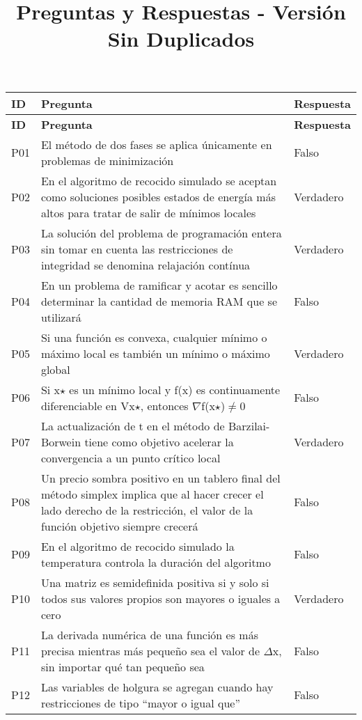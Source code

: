 \documentclass{article}
\title{Preguntas y Respuestas - Versión Sin Duplicados}
\author{}
\date{}
\begin{document}
\maketitle

\begin{longtable}{|p{1.5cm}|p{14cm}|p{2cm}|}
\hline
\textbf{ID} & \textbf{Pregunta} & \textbf{Respuesta} \\ 
\hline
\endfirsthead
\hline
\textbf{ID} & \textbf{Pregunta} & \textbf{Respuesta} \\
\hline
\endhead
\hline
\endfoot
\hline
\endlastfoot
P01 & El método de dos fases se aplica únicamente en problemas de minimización & Falso \\ \hline
P02 & En el algoritmo de recocido simulado se aceptan como soluciones posibles estados de energía más altos para tratar de salir de mínimos locales & Verdadero \\ \hline
P03 & La solución del problema de programación entera sin tomar en cuenta las restricciones de integridad se denomina relajación contínua & Verdadero \\ \hline
P04 & En un problema de ramificar y acotar es sencillo determinar la cantidad de memoria RAM que se utilizará & Falso \\ \hline
P05 & Si una función es convexa, cualquier mínimo o máximo local es también un mínimo o máximo global & Verdadero \\ \hline
P06 & Si x$\star$ es un mínimo local y f(x) es continuamente diferenciable en Vx$\star$, entonces $\nabla$f(x$\star$)$\neq$0 & Falso \\ \hline
P07 & La actualización de t en el método de Barzilai-Borwein tiene como objetivo acelerar la convergencia a un punto crítico local & Verdadero \\ \hline
P08 & Un precio sombra positivo en un tablero final del método simplex implica que al hacer crecer el lado derecho de la restricción, el valor de la función objetivo siempre crecerá & Falso \\ \hline
P09 & En el algoritmo de recocido simulado la temperatura controla la duración del algoritmo & Falso \\ \hline
P10 & Una matriz es semidefinida positiva si y solo si todos sus valores propios son mayores o iguales a cero & Verdadero \\ \hline
P11 & La derivada numérica de una función es más precisa mientras más pequeño sea el valor de $\Delta$x, sin importar qué tan pequeño sea & Falso \\ \hline
P12 & Las variables de holgura se agregan cuando hay restricciones de tipo “mayor o igual que” & Falso \\ \hline

\end{longtable}
\end{document}
